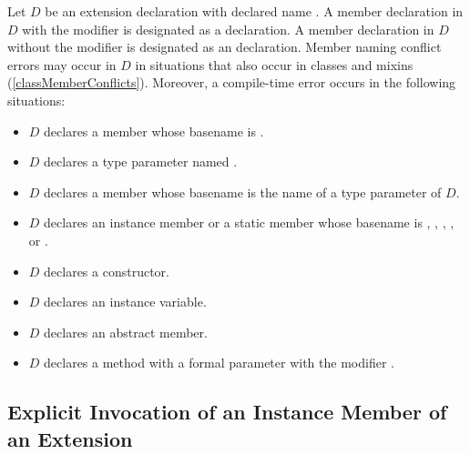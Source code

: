 \documentclass[makeidx]{article}
\begin{document}
\LMHash{}%
%
Let $D$ be an extension declaration with declared name .
A member declaration in $D$ with the modifier \STATIC{} is designated as a
declaration.
%
A member declaration in $D$ without the modifier \STATIC{} is designated as an
declaration.
%
Member naming conflict errors may occur in $D$
in situations that also occur in classes and mixins
(\ref{classMemberConflicts}).
Moreover, a compile-time error occurs in the following situations:

\begin{itemize}
\item $D$ declares a member whose basename is .
\item $D$ declares a type parameter named .
\item $D$ declares a member whose basename is the name of a type parameter
  of $D$.
\item $D$ declares an instance member or a static member whose basename is
  , , , ,
  or \lit{==}.
\item $D$ declares a constructor.
\item $D$ declares an instance variable.
\item $D$ declares an abstract member.
\item $D$ declares a method with a formal parameter
  with the modifier \COVARIANT.
\end{itemize}



\subsection{Explicit Invocation of an Instance Member of an Extension}
\end{document}
